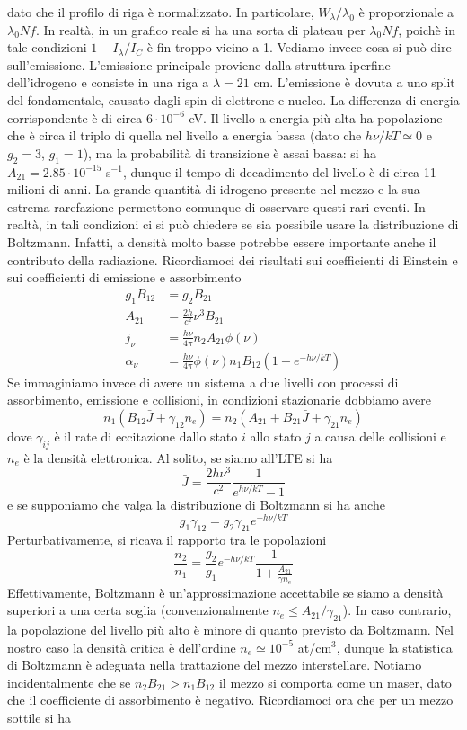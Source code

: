 \documentclass[a4paper,11pt]{article}
\theoremstyle{theorem}
\theoremstyle{definition}
\begin{document}
\begin{itemize}
		dato che il profilo di riga è normalizzato. In particolare, $W_\lambda/\lambda_0$ è proporzionale a $\lambda_0Nf$. In realtà, in un grafico reale si ha una sorta di plateau per $\lambda_0Nf$, poichè in tale condizioni $1-I_\lambda/I_C$ è fin troppo vicino a 1. Vediamo invece cosa si può dire sull'emissione. L'emissione principale proviene dalla struttura iperfine dell'idrogeno e consiste in una riga a $\lambda=21$ cm. L'emissione è dovuta a uno split del fondamentale, causato dagli spin di elettrone e nucleo. La differenza di energia corrispondente è di circa $6\cdot10^{-6}$ eV. Il livello a energia più alta ha popolazione che è circa il triplo di quella nel livello a energia bassa (dato che $h\nu/kT\simeq0$ e $g_2=3$, $g_1=1$), ma la probabilità di transizione è assai bassa: si ha $A_{21}=2.85\cdot10^{-15}$ s$^{-1}$, dunque il tempo di decadimento del livello è di circa 11 milioni di anni. La grande quantità di idrogeno presente nel mezzo e la sua estrema rarefazione permettono comunque di osservare questi rari eventi. In realtà, in tali condizioni ci si può chiedere se sia possibile usare la distribuzione di Boltzmann. Infatti, a densità molto basse potrebbe essere importante anche il contributo della radiazione. Ricordiamoci dei risultati sui coefficienti di Einstein e sui coefficienti di emissione e assorbimento
		\begin{align*}
			g_1B_{12}&=g_2B_{21}\\
			A_{21}&=\frac{2h}{c^2}\nu^3B_{21}\\
			j_{\nu}&=\frac{h\nu}{4\pi}n_2A_{21}\phi(\nu)\\
			\alpha_\nu&=\frac{h\nu}{4\pi}\phi(\nu)n_1B_{12}\left(1-e^{-h\nu/kT}\right)
		\end{align*}
		Se immaginiamo invece di avere un sistema a due livelli con processi di assorbimento, emissione e collisioni, in condizioni stazionarie dobbiamo avere
		\[n_1\left(B_{12}\bar{J}+\gamma_{12}n_e\right)=n_2(A_{21}+B_{21}\bar{J}+\gamma_{21}n_e)\]
		dove $\gamma_{ij}$ è il rate di eccitazione dallo stato $i$ allo stato $j$ a causa delle collisioni e $n_e$ è la densità elettronica. Al solito, se siamo all'LTE si ha
		\[\bar{J}=\frac{2h\nu^3}{c^2}\frac{1}{e^{h\nu/kT}-1}\]
		e se supponiamo che valga la distribuzione di Boltzmann si ha anche
		\[g_1\gamma_{12}=g_2\gamma_{21}e^{-h\nu/kT}\]
		Perturbativamente, si ricava il rapporto tra le popolazioni
		\[\frac{n_2}{n_1}=\frac{g_2}{g_1}e^{-h\nu/kT}\frac{1}{1+\frac{A_{21}}{\gamma n_e}}\]
		Effettivamente, Boltzmann è un'approssimazione accettabile se siamo a densità superiori a una certa soglia (convenzionalmente $n_e\leq A_{21}/\gamma_{21}$). In caso contrario, la popolazione del livello più alto è minore di quanto previsto da Boltzmann. Nel nostro caso la densità critica è dell'ordine $n_e\simeq 10^{-5}$ at/cm$^3$, dunque la statistica di Boltzmann è adeguata nella trattazione del mezzo interstellare. Notiamo incidentalmente che se $n_2B_{21}>n_1B_{12}$ il mezzo si comporta come un maser, dato che il coefficiente di assorbimento è negativo. Ricordiamoci ora che per un mezzo sottile si ha

\end{itemize}
\end{document}
